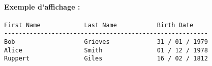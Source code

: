 
\paragraph*{Exemple d'affichage :}
\begin{verbatim}
First Name            Last Name           Birth Date
--------------------------------------------------------
Bob                   Grieves             31 / 01 / 1979
Alice                 Smith               01 / 12 / 1978
Ruppert               Giles               16 / 02 / 1812
\end{verbatim}


